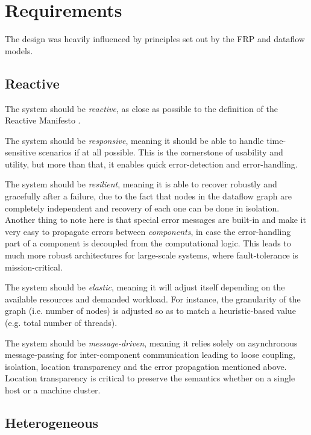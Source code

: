 \documentclass[sigplan,review,anonymous]{acmart}\settopmatter{printfolios=true,printacmref=false}
\begin{document}

\section{Requirements} \label{sec:requirements}

The design was heavily influenced by principles set out by the FRP and dataflow models.

\subsection{Reactive}

The system should be \textit{reactive}, as close as possible to the definition of the Reactive Manifesto \cite{manifesto}.

The system should be \textit{responsive}, meaning it should be able to handle time-sensitive scenarios if at all possible. This is the cornerstone of usability and utility, but more than that, it enables quick error-detection and error-handling.

The system should be \textit{resilient}, meaning it is able to recover robustly and gracefully after a failure, due to the fact that nodes in the dataflow graph are completely independent and recovery of each one can be done in isolation. Another thing to note here is that special error messages are built-in and make it very easy to propagate errors between \textit{components}, in case the error-handling part of a component is decoupled from the computational logic. This leads to much more robust architectures for large-scale systems, where fault-tolerance is mission-critical.

The system should be \textit{elastic}, meaning it will adjust itself depending on the available resources and demanded workload. For instance, the granularity of the graph (i.e. number of nodes) is adjusted so as to match a heuristic-based value (e.g. total number of threads).

The system should be \textit{message-driven}, meaning it relies solely on asynchronous message-passing for inter-component communication leading to loose coupling, isolation, location transparency and the error propagation mentioned above. Location transparency is critical to preserve the semantics whether on a single host or a machine cluster.


\subsection{Heterogeneous}
\end{document}
